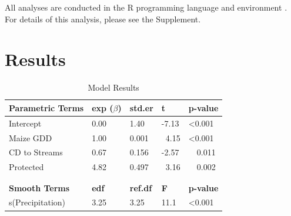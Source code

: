 \documentclass[
  number,
  preprint,
  3p]{elsarticle}
\begin{document}
All analyses are conducted in the R programming language and environment
\citep{rcoreteam2022}. For details of this analysis, please see the
Supplement.

\hypertarget{results}{%
\section{Results}\label{results}}

\hypertarget{tbl-results}{}
\begin{table}
\caption{\label{tbl-results}Model Results }\tabularnewline
[]
\centering
\begin{tabular}{lllll}
\textbf{Parametric Terms}  & \textbf{exp ($\beta$)}  & \textbf{std.er} & \textbf{t} & \textbf{p-value} \\ \midrule
Intercept                   & 0.00                      & 1.40             & -7.13       & \textless{}0.001 \\ 
Maize GDD                   & 1.00                      & 0.001            & ~4.15       & \textless{}0.001 \\ 
CD to Streams               & 0.67                      & 0.156            & -2.57       & ~~0.011           \\ 
Protected                   & 4.82                      & 0.497            & ~3.16       & ~~0.002           \\ \bottomrule
                            &                           &                  &             &                   \\ 
                            &                           &                  &             &                   \\ 
\textbf{Smooth Terms}      & \textbf{edf}             & \textbf{ref.df} & \textbf{F} & \textbf{p-value} \\ \midrule
s(Precipitation)            & 3.25                      & 3.25             & 11.1        & \textless{}0.001 \\ \bottomrule
\end{tabular}
\end{table}
\end{document}
